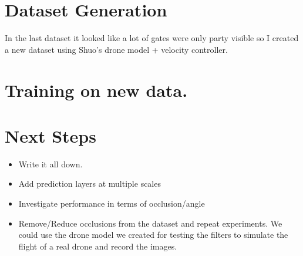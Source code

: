 \documentclass{article}
\begin{document}
\section{Dataset Generation}

In the last dataset it looked like a lot of gates were only party visible so I created a new dataset using Shuo's drone model + velocity controller.

\section{Training on new data.}



\section{Next Steps}
\begin{itemize}
	\item Write it all down.
	\item Add prediction layers at multiple scales
	\item Investigate performance in terms of occlusion/angle
	\item Remove/Reduce occlusions from the dataset and repeat experiments. We could use the drone model we created for testing the filters to simulate the flight of a real drone and record the images.

\end{itemize}
\end{document}

